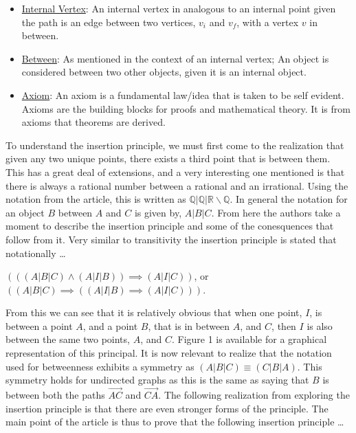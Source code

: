 \documentclass[a4paper,man,natbib]{apa6}
\newcommand{\R}{\mathbb{R}}  %
\newcommand{\Q}{\mathbb{Q}}  %
\begin{document}
\begin{itemize}
      \item \underline{Internal Vertex}: An internal vertex in analogous to an internal point given the path is an edge between two vertices,  $ v_i $ and $ v_f $, with a vertex $ v $ in between.

      \item \underline{Between}: As mentioned in the context of an internal vertex; An object is considered between two other objects, given it is an internal object.

      \item \underline{Axiom}: An axiom is a fundamental law/idea that is taken to be self evident. Axioms are the building blocks for proofs and mathematical theory. It is from axioms that theorems are derived.

\end{itemize}

\noindent
To understand the insertion principle, we must first come to the realization that given any two unique points, there exists a third point that is between them.
This has a great deal of extensions, and a very interesting one mentioned is that there is always a rational number between a rational and an irrational.
Using the notation from the article, this is written as $ \Q | \Q | \R \backslash \Q $.
In general the notation for an object $ B $ between $ A $ and $ C $ is given by, $ A | B | C $.
From here the authors take a moment to describe the insertion principle and some of the conesquences that follow from it.
Very similar to transitivity the insertion principle is stated that notationally \dots

\begin{center}

      $ ( ( (A | B | C) \land (A | I | B) ) \implies (A | I | C) ) $, or $ ( (A | B | C) \implies( (A | I | B) \implies (A | I | C) ) ) $.

\end{center}

\noindent
From this we can see that it is relatively obvious that when one point, $ I $, is between a point $ A $, and a point $ B $, that is in between $ A $, and $ C $, then $ I $ is also between the same two points, $ A $, and $ C $.
Figure 1 is available for a graphical representation of this principal. It is now relevant to realize that the notation used for betweenness exhibits a symmetry as $  (A | B | C) \equiv (C | B | A) $.
This symmetry holds for undirected graphs as this is the same as saying that $ B $ is between both the paths $ \overrightarrow{AC} $ and $ \overrightarrow{CA} $.
The following realization from exploring the insertion principle is that there are even stronger forms of the principle.
The main point of the article is thus to prove that the following insertion principle \dots
\end{document}
